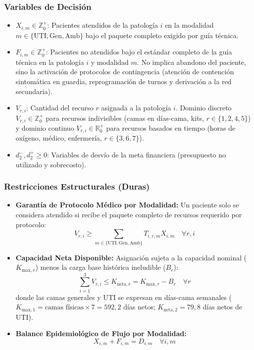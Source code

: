 \documentclass[conference]{IEEEtran}
\begin{document}
\subsubsection{Variables de Decisión}
\begin{itemize}
    \item $X_{i,m} \in \mathbb{Z}_0^+$: Pacientes atendidos de la patología $i$ en la modalidad $m \in \{\text{UTI}, \text{Gen}, \text{Amb}\}$ bajo el paquete completo exigido por guía técnica.
    \item $F_{i,m} \in \mathbb{Z}_0^+$: Pacientes no atendidos bajo el estándar completo de la guía técnica en la patología $i$ y modalidad $m$. No implica abandono del paciente, sino la activación de protocolos de contingencia (atención de contención sintomática en guardia, reprogramación de turnos y derivación a la red secundaria).
    \item $V_{r,i}$: Cantidad del recurso $r$ asignada a la patología $i$. Dominio discreto $V_{r,i} \in \mathbb{Z}_0^+$ para recursos indivisibles (camas en días-cama, kits, $r \in \{1,2,4,5\}$) y dominio continuo $V_{r,i} \in \mathbb{R}_0^+$ para recursos basados en tiempo (horas de oxígeno, médico, enfermería, $r \in \{3,6,7\}$).
    \item $d_2^-, d_2^+ \ge 0$: Variables de desvío de la meta financiera (presupuesto no utilizado y sobrecosto).
\end{itemize}

\subsubsection{Restricciones Estructurales (Duras)}
\begin{itemize}
    \item \textbf{Garantía de Protocolo Médico por Modalidad:} Un paciente solo se considera atendido si recibe el paquete completo de recursos requerido por protocolo:
          \begin{equation}
              V_{r,i} \ge \sum_{m \in \{\text{UTI}, \text{Gen}, \text{Amb}\}} T_{i,r,m} X_{i,m} \quad \forall r, i
          \end{equation}
    \item \textbf{Capacidad Neta Disponible:} Asignación sujeta a la capacidad nominal ($K_{\text{max},r}$) menos la carga base histórica ineludible ($B_r$):
          \begin{equation}
              \sum_{i=1}^{3} V_{r,i} \le K_{\text{neta},r} = K_{\text{max},r} - B_r \quad \forall r
          \end{equation}
          donde las camas generales y UTI se expresan en días-cama semanales ($K_{\text{max},1} = \text{camas físicas} \times 7 = 592{,}2$ días netos; $K_{\text{neta},2} = 79{,}8$ días netos de UTI).
    \item \textbf{Balance Epidemiológico de Flujo por Modalidad:}
          \begin{equation}
              X_{i,m} + F_{i,m} = D_{i,m} \quad \forall i, m
          \end{equation}
\end{itemize}
\end{document}
